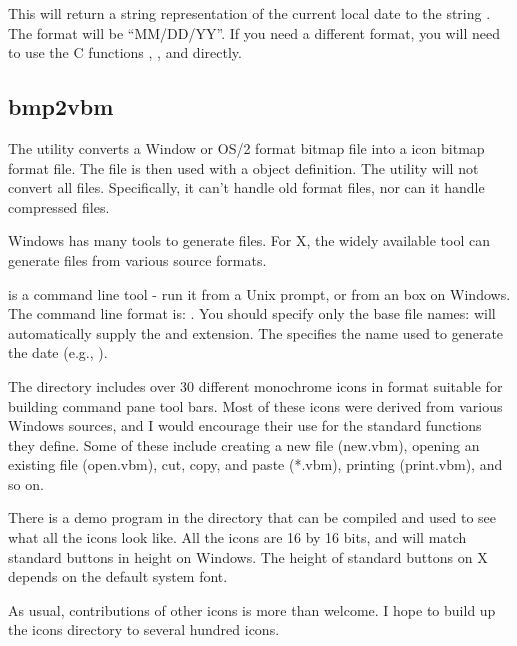 
This will return a string representation of the current local
date to the string . The format will be ``MM/DD/YY''.
If you need a different format, you will need to use the C
functions , , and 
directly.

 

\subsection*{bmp2vbm}

The utility  converts a Window or OS/2 
format bitmap file into a  \V icon bitmap format file.
The  file is then used with a  object
definition. The  utility will not convert all
 files. Specifically, it can't handle old format
 files, nor can it handle compressed  files.

Windows has many tools to generate  files. For X,
the widely available tool  can generate 
files from various source formats.

 is a command line tool - run it from a Unix prompt,
or from an  box on Windows. The command line format is:
. You should specify only
the base file names:  will automatically supply
the  and  extension. The 
specifies the name used to generate the date (e.g., ).


The directory  includes over 30 different monochrome
icons in  format suitable for building command pane
tool bars. Most of these icons were derived from various
Windows sources, and I would encourage their use for the
standard functions they define. Some of these include
creating a new file (new.vbm), opening an existing file (open.vbm),
cut, copy, and paste (*.vbm), printing (print.vbm), and so on.

There is a demo program in the  directory that
can be compiled and used to see what all the icons look like.
All the icons are 16 by 16 bits, and
will match standard buttons in height on Windows. The height of 
standard buttons on X depends on the default system font.

As usual, contributions of other \V icons is more than welcome.
I hope to build up the icons directory to several hundred icons.
